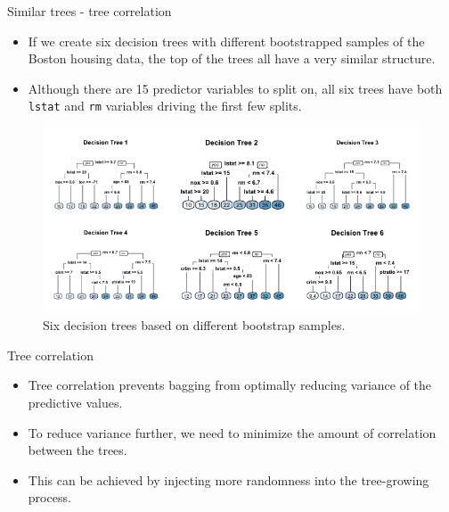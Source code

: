 \documentclass[
  10pt,
  ignorenonframetext,
]{beamer}
\providecommand{\tightlist}{%
  \setlength{\itemsep}{0pt}\setlength{\parskip}{0pt}}
\begin{document}
\begin{frame}[fragile]{Similar trees - tree correlation}
\protect\hypertarget{similar-trees---tree-correlation}{}

\begin{itemize}
\tightlist
\item
  If we create six decision trees with different bootstrapped samples of
  the Boston housing data, the top of the trees all have a very similar
  structure.
\item
  Although there are 15 predictor variables to split on, all six trees
  have both \texttt{lstat} and \texttt{rm} variables driving the first
  few splits.
\end{itemize}

\begin{figure}
\centering
\includegraphics{figure/tree-correlation-1.png}
\caption{Six decision trees based on different bootstrap samples.}
\end{figure}

\end{frame}

\begin{frame}{Tree correlation}
\protect\hypertarget{tree-correlation}{}

\begin{itemize}
\tightlist
\item
  Tree correlation prevents bagging from optimally reducing variance of
  the predictive values.
\item
  To reduce variance further, we need to minimize the amount of
  correlation between the trees.
\item
  This can be achieved by injecting more randomness into the
  tree-growing process.
\end{itemize}

\end{frame}
\end{document}
